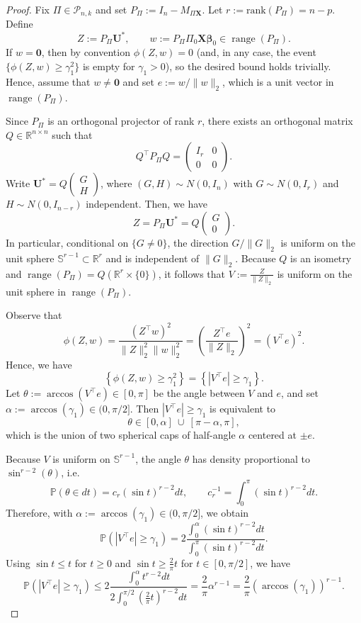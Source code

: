 \documentclass[11pt, reqno]{amsart}
\newcommand{\bP}{\mathbb{P}}
\renewcommand{\le}{\leqslant}
\renewcommand{\ge}{\geqslant}
\newcommand{\mP}{\mathcal{P}}
\newcommand{\1}{\mbox{1}\hspace{-0.25em}\mbox{l}}
\newcommand{\rank}{\mathrm{rank}}
\DeclareMathOperator{\range}{range}
\theoremstyle{definition}\newtheorem{problem}{Problem}[section]
\theoremstyle{definition}\newtheorem{definition}[problem]{Definition}
\theoremstyle{remark}\newtheorem{assumption}{Assumption}
\theoremstyle{remark}\newtheorem{remark}[problem]{Remark}
\theoremstyle{definition}\newtheorem{example}[problem]{Example}
\theoremstyle{plain}\newtheorem{theorem}[problem]{Theorem}
\theoremstyle{plain}\newtheorem{question}[problem]{Question}
\theoremstyle{plain}\newtheorem{lemma}[problem]{Lemma}
\theoremstyle{plain}\newtheorem{proposition}[problem]{Proposition}
\theoremstyle{plain}\newtheorem{corollary}[problem]{Corollary}
\theoremstyle{plain}\newtheorem{conjecture}[problem]{Conjecture}
\begin{document}
\begin{proof}
Fix $\Pi\in\mP_{n,k}$ and set $P_\Pi:=I_n-M_{\Pi\bm X}$.
Let $r:=\rank(P_\Pi)=n-p$. Define
\[
Z:=P_\Pi\bm U^*,
\qquad
w:=P_\Pi\Pi_0\bm X\bm\beta_0 \in \range(P_\Pi).
\]
If $w=\bm 0$, then by convention $\phi(Z,w)=0$ (and, in any case, the event
$\{\phi(Z,w)\ge \gamma_1^2\}$ is empty for $\gamma_1>0$), so the desired bound holds trivially.
Hence, assume that $w\neq \bm 0$ and set $e:=w/\|w\|_2$, which is a unit vector in $\range(P_\Pi)$.


Since $P_\Pi$ is an orthogonal projector of rank $r$, there exists an orthogonal matrix
$Q\in\mathbb R^{n\times n}$ such that
\[
Q^\top P_\Pi Q=\begin{pmatrix} I_r & 0\\ 0 & 0\end{pmatrix}.
\]
Write $\bm U^*=Q\begin{pmatrix}G\\H\end{pmatrix}$, where $(G,H)\sim N(0,I_n)$ with
$G\sim N(0,I_r)$ and $H\sim N(0,I_{n-r})$ independent. Then, we have
\[
Z=P_\Pi\bm U^*=Q\begin{pmatrix}G\\0\end{pmatrix}.
\]
In particular, conditional on $\{G\neq 0\}$, the direction $G/\|G\|_2$ is uniform on the unit
sphere $\mathbb S^{r-1}\subset\mathbb R^r$ and is independent of $\|G\|_2$.
Because $Q$ is an isometry and $\range(P_\Pi)=Q(\mathbb R^r\times\{0\})$, it follows that $V:=\frac{Z}{\|Z\|_2}
$ is uniform on the unit sphere in $\range(P_\Pi)$.

Observe that
\[
\phi(Z,w)=\frac{(Z^\top w)^2}{\|Z\|_2^2\|w\|_2^2}
=\left(\frac{Z^\top e}{\|Z\|_2}\right)^2
=(V^\top e)^2.
\]
Hence, we have
\[
\left\{\phi(Z,w)\ge \gamma_1^2\right\}
=
\left\{|V^\top e|\ge \gamma_1\right\}.
\]
Let $\theta:=\arccos(V^\top e)\in[0,\pi]$ be the angle between $V$ and $e$, and set
$\alpha:=\arccos(\gamma_1)\in(0,\pi/2]$. Then $|V^\top e|\ge \gamma_1$ is equivalent to
\[
\theta\in[0,\alpha]\ \cup\ [\pi-\alpha,\pi],
\]
which is the union of two spherical caps of half-angle $\alpha$ centered at $\pm e$.

Because $V$ is uniform on $\mathbb S^{r-1}$, the angle $\theta$ has density proportional to
$\sin^{r-2}(\theta)$, i.e.
\[
\bP(\theta\in dt)=c_r(\sin t)^{r-2}dt,
\qquad
c_r^{-1}=\int_0^\pi (\sin t)^{r-2}dt.
\]
Therefore, with $\alpha:=\arccos(\gamma_1)\in(0,\pi/2]$, we obtain
\[
\bP\left(|V^\top e|\ge \gamma_1\right)
=2\frac{\int_0^\alpha (\sin t)^{r-2}dt}{\int_0^\pi (\sin t)^{r-2}dt}.
\]
Using $\sin t\le t$ for $t\ge 0$ and $\sin t\ge \frac{2}{\pi}t$ for $t\in[0,\pi/2]$, we have
\[
\bP\left(|V^\top e|\ge \gamma_1\right)
\le
2\frac{\int_0^\alpha t^{r-2}dt}{2\int_0^{\pi/2} \left(\frac{2}{\pi}t\right)^{r-2}dt}
=
\frac{2}{\pi}\alpha^{r-1}
=
\frac{2}{\pi}\left(\arccos(\gamma_1)\right)^{r-1}.
\]



\end{proof}
\end{document}
